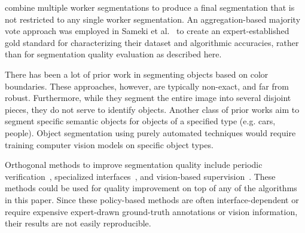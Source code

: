  combine multiple worker segmentations to produce a final segmentation that is not restricted to any single worker segmentation. An aggregation-based majority vote approach was employed in Sameki et al.~\cite{Sameki2015} to create an expert-established gold standard for characterizing their dataset and algorithmic accuracies, rather than for segmentation quality evaluation as described here.

 There has been a lot of prior work in segmenting objects based on color boundaries\cite{felzenszwalb2004efficient,Y.Y.Boykov2001}. These approaches, however, are typically non-exact, and far from robust. Furthermore, while they segment the entire image into several disjoint pieces, they do not serve to identify objects. Another class of prior works aim to segment specific semantic objects for objects of a specified type (e.g. cars, people)\cite{AdrianaKovashka2016,Lin2014,zhou2017scene}. Object segmentation using purely automated techniques would require training computer vision models on specific object types. 
\par Orthogonal methods to improve segmentation quality include periodic verification~\cite{Lin2014,Everingham15}, specialized interfaces~\cite{Song2018}, and vision-based supervision~\cite{Russakovsky2015,Gurari2016}. These methods could be used for quality improvement on top of any of the algorithms in this paper.  Since these policy-based methods are often interface-dependent or require expensive expert-drawn ground-truth annotations or vision information, their results are not easily reproducible. %

